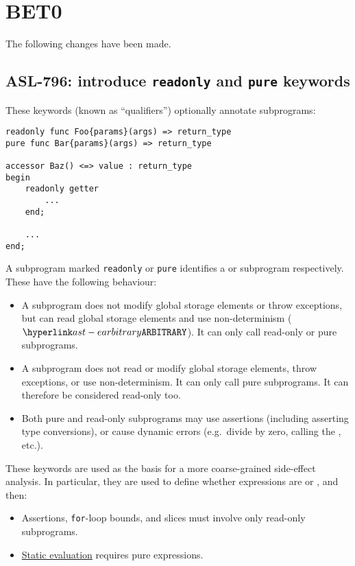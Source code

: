\section{BET0}

The following changes have been made.

\subsection{ASL-796: introduce \texttt{readonly} and \texttt{pure} keywords}

These keywords (known as ``qualifiers'') optionally annotate subprograms:
\begin{lstlisting}
readonly func Foo{params}(args) => return_type
pure func Bar{params}(args) => return_type

accessor Baz() <=> value : return_type
begin
    readonly getter
        ...
    end;

    ...
end;
\end{lstlisting}

\noindent
A subprogram marked \texttt{readonly} or \texttt{pure} identifies a \readonly{} or \pure{} subprogram respectively.
These have the following behaviour:
\begin{itemize}
  \item A \readonly{} subprogram does not modify global storage elements or throw exceptions, but can read global storage elements and use non-determinism ($\ARBITRARY$).
    It can only call read-only or pure subprograms.
  \item A \pure{} subprogram does not read or modify global storage elements, throw exceptions, or use non-determinism. It can only call pure subprograms. It can therefore be considered read-only too.
  \item Both pure and read-only subprograms may use assertions (including asserting type conversions), or cause dynamic errors (e.g.\ divide by zero, calling the \unreachablestatementterm{}, etc.).
\end{itemize}

\noindent
These keywords are used as the basis for a more coarse-grained side-effect analysis.
In particular, they are used to define whether expressions are \pure{} or \readonly{}, and then:
\begin{itemize}
  \item Assertions, \texttt{for}-loop bounds, and slices must involve only read-only subprograms.
  \item \hyperlink{def-staticeval}{Static evaluation} requires pure expressions.
\end{itemize}

